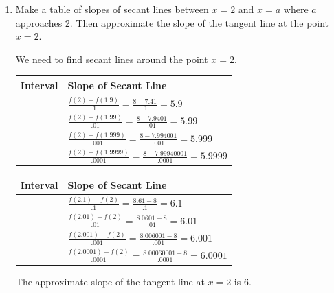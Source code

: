 \documentclass[nooutcomes]{ximera}
\begin{document}
\begin{problem}
\[\begin{array}{lr}
\\

\end{array} \]
	
		\begin{enumerate}
			
		\item  Make a table of slopes of secant lines between $x=2$ and $x=a$ where $a$ approaches 2.  Then approximate the slope of the tangent line at the point $x=2$.
		\begin{freeResponse}		 
		We need to find secant lines around the point $x=2$.
		
			\begin{tabular}{|l|l|}
			\hline
			Interval & Slope of Secant Line  \\
			\hline
			[1.9,2] & $ \frac{f(2)-f(1.9)}{.1}=\frac{8-7.41}{.1}=5.9$  \\
			\hline
			[1.99,2] & $\frac{f(2)-f(1.99)}{.01}=\frac{8-7.9401}{.01}=5.99$  \\
			\hline
			[1.999,2] & $\frac{f(2)-f(1.999)}{.001}=\frac{8-7.994001}{.001}=5.999$  \\
			\hline
			[1.9999,2] & $\frac{f(2)-f(1.9999)}{.0001}=\frac{8-7.99940001}{.0001}=5.9999$  \\
			\hline
			\end{tabular}
			
			\begin{tabular}{|l|l|}
			\hline
			Interval & Slope of Secant Line  \\
			\hline
			[2,2.1] & $ \frac{f(2.1)-f(2)}{.1}=\frac{8.61-8}{.1}=6.1$  \\
			\hline
			[2,2.01] & $\frac{f(2.01)-f(2)}{.01}=\frac{8.0601-8}{.01}=6.01$  \\
			\hline
			[2,2.001] & $\frac{f(2.001)-f(2)}{.001}=\frac{8.006001-8}{.001}=6.001$  \\
			\hline
			[2,2.0001] & $\frac{f(2.0001)-f(2)}{.0001}=\frac{8.00060001-8}{.0001}=6.0001$  \\
			\hline
			\end{tabular}
			
		The approximate slope of the tangent line at $x=2$ is 6.
		\end{freeResponse}
			  

\end{enumerate}
\end{problem}
\end{document}
